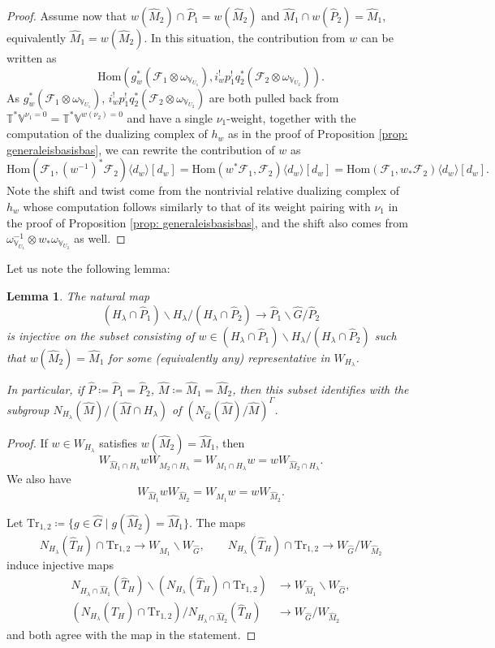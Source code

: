 \documentclass{amsart}
\newtheorem{lemma}[theorem]{Lemma}
\theoremstyle{definition}
\theoremstyle{remark}
\numberwithin{equation}{section}
\newcommand{\mc}{\mathcal}
\newcommand{\Hom}{\mathrm{Hom}}
\newcommand{\wh}{\widehat}
\newcommand{\V}{\mathbb{V}}
\newcommand{\T}{\mathbb{T}}
\begin{document}
\begin{proof}
Assume now that $w(\wh M_2)\cap \wh P_1= w(\wh M_2)$ and $\wh M_1\cap w(\wh P_2)=\wh M_1$, equivalently $\wh M_1=w(\wh M_2)$. In this situation, the contribution from $w$ can be written as
\[
\Hom(g_w^* (\mc F_1\otimes \omega_{\V_{U_1}}), i_w^! p_1^! q_2^* (\mc F_2\otimes \omega_{\V_{U_2}})). 
\]
As $g_w^* (\mc F_1\otimes \omega_{\V_{U_1}})$, $i_w^! p_1^! q_2^* (\mc F_2\otimes \omega_{\V_{U_2}})$ are both pulled back from $\T^*\V^{\nu_1=0}=\T^*\V^{w(\nu_2)=0}$ and have a single $\nu_1$-weight, together with the computation of the dualizing complex of $h_w$ as in the proof of Proposition \ref{prop: generaleisbasisbas}, we can rewrite the contribution of $w$ as
\[
\Hom(\mc F_1, (w^{-1})^* \mc F_2)\langle d_w \rangle[d_w]=\Hom(w^*\mc F_1, \mc F_2)\langle d_w \rangle[d_w]=\Hom(\mc F_1, w_*\mc F_2)\langle d_w \rangle[d_w]. 
\]
Note the shift and twist come from the nontrivial relative dualizing complex of $h_w$ whose computation follows similarly to that of its weight pairing with $\nu_1$ in the proof of Proposition \ref{prop: generaleisbasisbas}, and the shift also comes from $\omega^{-1}_{\V_{U_1}} \otimes w_{\ast}\omega_{\V_{U_2}}$ as well. 
\end{proof}

Let us note the following lemma:

\begin{lemma}{\label{lem: dblcosetlem}}
The natural map 
\[
(H_{\lambda}\cap \wh P_1)\backslash H_\lambda /(H_{\lambda}\cap \wh P_2) \to
\wh P_1 \backslash \wh G /\wh P_2
\]
is injective on the subset consisting of
$w\in (H_{\lambda}\cap \wh P_1)\backslash H_\lambda /(H_{\lambda}\cap \wh P_2)$
such that $w(\wh M_2)=\wh M_1$ for some (equivalently any) representative in $W_{H_\lambda}$.

In particular, if $\wh P\coloneq\wh P_1=\wh P_2$, $\wh M\coloneq \wh M_1=\wh M_2$, then this subset identifies with the subgroup $N_{H_\lambda}(\wh M)/(\wh M \cap H_\lambda)$ of $(N_{\wh G}(\wh M)/\wh M)^\Gamma$. 
\end{lemma}

\begin{proof}
If $w\in W_{H_\lambda}$ satisfies $w (\wh M_2)=\wh M_1$, then 
\[
W_{\wh M_1 \cap H_\lambda}w W_{\wh M_2\cap H_\lambda}=W_{\wh M_1 \cap H_\lambda}w=w W_{\wh M_2 \cap H_\lambda}.
\]
We also have
\[
W_{\wh M_1}w W_{\wh M_2}= W_{\wh M_1}w=w W_{\wh M_2}.
\]

Let $\mathrm{Tr}_{1,2}\coloneq \{g\in \wh G \mid g(\wh M_2)=\wh M_1\}$. The maps 
\[
N_{H_{\lambda}}(\wh T_H) \cap \mathrm{Tr}_{1,2} \to W_{\wh M_1}\backslash W_{\wh G}, \qquad
N_{H_{\lambda}}(\wh T_H) \cap \mathrm{Tr}_{1,2} \to W_{\wh G}/W_{\wh M_2}
\]
induce injective maps
\begin{align*}
N_{H_\lambda \cap \wh M_1}(\wh T_H) \backslash (N_{H_{\lambda}}(\wh T_H) \cap \mathrm{Tr}_{1,2}) &\to W_{\wh M_1}\backslash W_{\wh G}, \\
(N_{H_{\lambda}}(\wh T_H) \cap \mathrm{Tr}_{1,2})/N_{H_\lambda \cap \wh M_2}(\wh T_H) &\to W_{\wh G}/W_{\wh M_2} 
\end{align*}
and both agree with the map in the statement. 
\end{proof}
\end{document}
